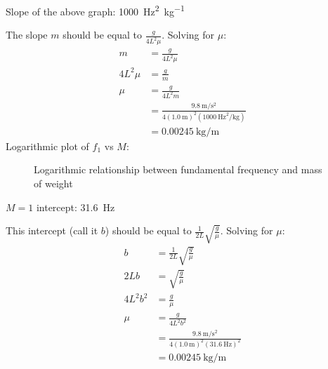 \documentclass[11pt]{article}
\begin{document}
        Slope of the above graph: \SI{1000}{\hertz\squared\per\kilogram}
        \par\noindent
        The slope $m$ should be equal to $\frac{g}{4L^2\mu}$. Solving for $\mu$:
        \begin{align*}
            m&=\frac{g}{4L^2\mu} \\
            4L^2\mu&=\frac{g}{m} \\
            \mu&=\frac{g}{4L^2m} \\
            &=\frac{\SI{9.8}{\meter\per\square\second}}{4(\SI{1.0}{\meter})^2(\SI{1000}{\hertz\squared\per\kilogram})} \\
            &=\SI{0.00245}{\kilogram\per\meter}
        \end{align*}
        Logarithmic plot of $f_1$ vs $M$:
        \begin{figure}[H]
            \centering
            \caption{Logarithmic relationship between fundamental frequency and mass of weight}
        \end{figure}
        $M=1$ intercept: \SI{31.6}{\hertz}
        \par\noindent
        This intercept (call it $b$) should be equal to $\frac{1}{2L}\sqrt{\frac{g}{\mu}}$. Solving for $\mu$:
        \begin{align*}
            b&=\frac{1}{2L}\sqrt{\frac{g}{\mu}} \\
            2Lb&=\sqrt{\frac{g}{\mu}} \\
            4L^2b^2&=\frac{g}{\mu} \\
            \mu&=\frac{g}{4L^2b^2} \\
            &=\frac{\SI{9.8}{\meter\per\square\second}}{4(\SI{1.0}{\meter})^2(\SI{31.6}{\hertz})^2} \\
            &=\SI{0.00245}{\kilogram\per\meter}
        \end{align*}
\end{document}

